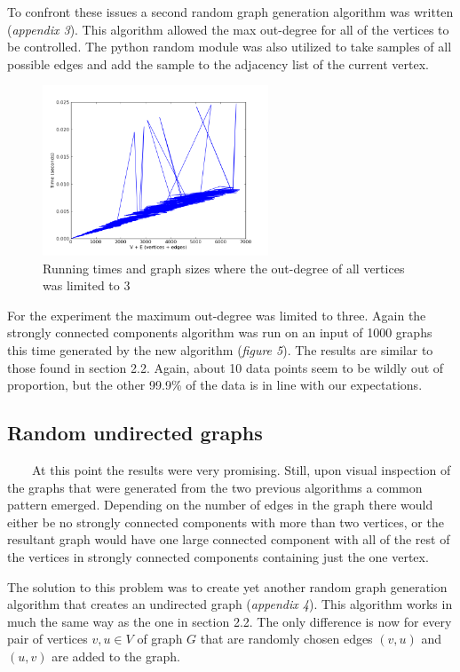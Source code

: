 \documentclass[12pt]{article}
\begin{document}
  To confront these issues a second random graph generation algorithm was written (\emph{appendix 3}). This algorithm allowed the max out-degree for all of the vertices to be controlled. The python random module was also utilized to take samples of all possible edges and add the sample to the adjacency list of the current vertex.
  
    \begin{figure}[h!]
    \centering
      \includegraphics[width=0.6\textwidth]{Graphoutmax3.png}
        \caption{Running times and graph sizes where the out-degree of all vertices was limited to 3}
\end{figure} 

  For the experiment the maximum out-degree was limited to three. Again the strongly connected components algorithm was run on an input of 1000 graphs this time generated by the new algorithm (\emph{figure 5}). The results are similar to those found in section 2.2.  Again, about 10 data points seem to be wildly out of proportion, but the other 99.9\% of the data is in line with our expectations.
  
  \subsection{Random undirected graphs}
  \ \ \ \ At this point the results were very promising. Still, upon visual inspection of the graphs that were generated from the two previous algorithms a common pattern emerged. Depending on the number of edges in the graph there would either be no strongly connected components with more than two vertices, or the resultant graph would have one large connected component with all of the rest of the vertices in strongly connected components containing just the one vertex.
  
  The solution to this problem was to create yet another random graph generation algorithm that creates an undirected graph (\emph{appendix 4}). This algorithm works in much the same way as the one in section 2.2. The only difference is now for every pair of vertices $ v,u \in V $ of graph $ G $ that are randomly chosen edges $ (v,u) $ and $ (u,v) $ are added to the graph.
  
\end{document}
